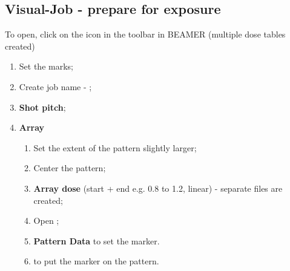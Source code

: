 \subsection{Visual-Job - prepare for exposure }
\label{sec:visual-job-add}

To open,  click on the icon  in the toolbar in  BEAMER (multiple dose
tables created)  
\begin{enumerate}
\item Set the marks;
\item Create job name - ;
\item \textbf{Shot pitch};
\item \textbf{Array}
  \begin{enumerate}
  \item Set the extent of the pattern slightly larger;
  \item Center the pattern;
  \item \textbf{Array dose} (start + end  e.g.  0.8 to 1.2, linear) -
    separate  files are created;
  \item Open ;
  \item \textbf{Pattern Data} to set the marker.
  \item {} to put the marker on the pattern.
  \end{enumerate}
\end{enumerate}

\newpage
